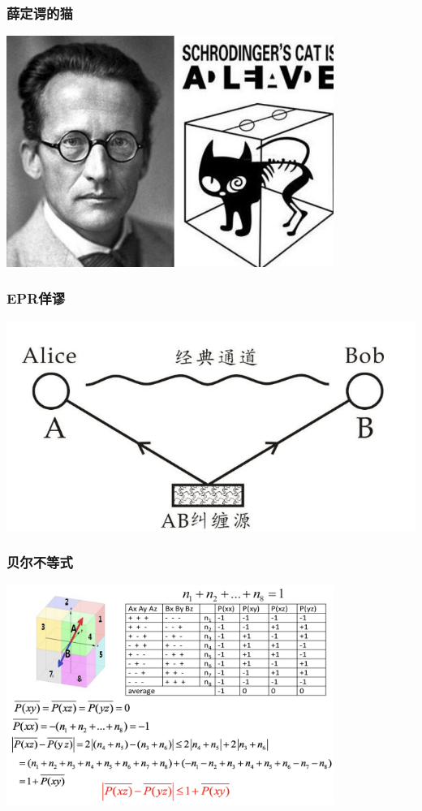 \begin{frame}
    \frametitle{薛定谔的猫}
    \begin{center}
        \includegraphics[width=0.8\textwidth]{figs/cat.jpeg} \\
    \end{center} 
\end{frame}

\begin{frame}
    \frametitle{EPR佯谬}
    \begin{center}
        \includegraphics[width=1.0\textwidth]{figs/2022-01-09-14-45-26.png} \\
    \end{center} 
\end{frame}

\begin{frame}
    \frametitle{贝尔不等式}
    \begin{center}
        \includegraphics[width=0.8\textwidth]{figs/bell.png} \\
    \end{center} 
\end{frame}


